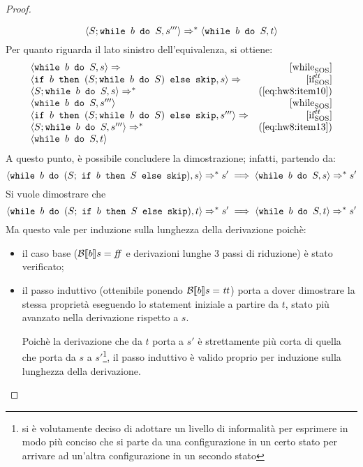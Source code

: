 \begin{proof}
\begin{itemize}
  \begin{equation}
  \confSs{S; \wbS{b}{S}}{s'''} \Rar{*} \confSs{\wbS{b}{S}}{t}
  \label{eq:hw8:item13}
  \end{equation}
  Per quanto riguarda il lato sinistro dell'equivalenza, si ottiene:
  $$
  \begin{array}{lr}
  \confSs{\wbS{b}{S}}{s} \Rar{ }  & \whileSOS \\
  \confSs{\ifABC{b}{(S;\wbS{b}{S})}{\skipForFriends}}{s} \Rar{ } & \ifttSOS\\
  \confSs{S; \wbS{b}{S}}{s} \Rar{*} & (\text{\ref{eq:hw8:item10}})\\
  \confSs{\wbS{b}{S}}{s'''}  & \whileSOS \\
  \confSs{\ifABC{b}{(S;\wbS{b}{S})}{\skipForFriends}}{s'''}
      \Rar{ } & \ifttSOS\\
  \confSs{S;\wbS{b}{S}}{s'''} \Rar{*} & (\text{\ref{eq:hw8:item13}}) \\
  \confSs{\wbS{b}{S}}{t}
  \end{array}
  $$
  A questo punto, è possibile concludere la dimostrazione; infatti, partendo
  da:
  $$
  \confSs{\wbS{b}{(S;\ \ifABC{b}{S}{\skipForFriends})}}{s} \Rar{*} s'
  \implies
  \confSs{\wbS{b}{S}}{s} \Rar{*} s'
  $$
  Si vuole dimostrare che
  $$
  \confSs{\wbS{b}{(S;\ \ifABC{b}{S}{\skipForFriends})}}{t} \Rar{*} s'
  \implies
  \confSs{\wbS{b}{S}}{t} \Rar{*} s'
  $$
  Ma questo vale per induzione sulla lunghezza della derivazione poichè:
  \begin{itemize}
    \item il caso base ($\B{b} = \semfalse$ e derivazioni lunghe 3 passi di
      riduzione) è stato verificato;
    \item il passo induttivo (ottenibile ponendo $\B{b} = \semtrue$) porta a
      dover dimostrare la stessa proprietà eseguendo lo statement iniziale a
      partire da $t$, stato più avanzato nella derivazione rispetto a $s$.

      Poichè la derivazione che da $t$ porta a $s'$ è strettamente più corta di
      quella che porta da $s$ a $s'$\footnote{si è volutamente deciso di
      adottare un livello di informalità per esprimere in modo più
      conciso che si parte da una configurazione in un certo stato per
      arrivare ad un'altra configurazione in un secondo stato}, il passo induttivo è valido proprio per
      induzione sulla lunghezza della derivazione.
  \end{itemize}
\end{itemize}

\end{proof}
